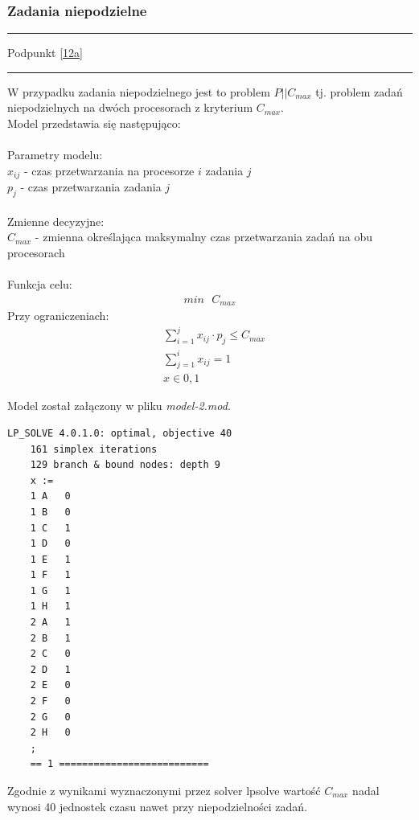 \documentclass[
    12pt, %
]{../fphw}
\begin{document}
\subsubsection{Zadania niepodzielne}
\par\noindent\rule{\textwidth}{0.4pt}
Podpunkt \ref{12a}
\par\noindent\rule{\textwidth}{0.4pt}
W przypadku zadania niepodzielnego jest to problem \(P||C_{max}\)
tj. problem zadań niepodzielnych na dwóch procesorach z kryterium \(C_{max}\). \\
Model przedstawia się następująco: \\ \\
Parametry modelu: \\
\(x_{ij}\) - czas przetwarzania na procesorze \(i\) zadania \(j\) \\
\(p_j\) - czas przetwarzania zadania \(j\) \\ \\
Zmienne decyzyjne: \\
\(C_{max}\) - zmienna określająca maksymalny czas przetwarzania zadań na obu procesorach \\ \\
Funkcja celu: \\
\begin{align*}
    min \text{ } C_{max}
\end{align*}
\newpage
Przy ograniczeniach: \\
\begin{align*}
     & \sum^j_{i=1}x_{ij} \cdot p_j \leq C_{max} \\
     & \sum^i_{j=1}x_{ij} = 1                    \\
     & x \in  {0,1}
\end{align*}


Model został załączony w pliku \textit{model-2.mod}.

\begin{lstlisting}[caption=Rozwiązanie znalezione solwerem lpsolve]
    LP_SOLVE 4.0.1.0: optimal, objective 40
    161 simplex iterations
    129 branch & bound nodes: depth 9
    x :=
    1 A   0
    1 B   0
    1 C   1
    1 D   0
    1 E   1
    1 F   1
    1 G   1
    1 H   1
    2 A   1
    2 B   1
    2 C   0
    2 D   1
    2 E   0
    2 F   0
    2 G   0
    2 H   0
    ;
    == 1 ==========================
\end{lstlisting}
Zgodnie z wynikami wyznaczonymi przez solver lpsolve wartość \(C_{max}\) nadal wynosi 40 jednostek czasu
nawet przy niepodzielności zadań.
\end{document}
